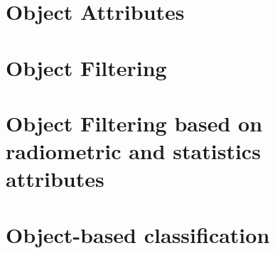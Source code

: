 \section{Object Attributes}\label{sec:ObjectAttributes}


\section{Object Filtering}


\section{Object Filtering based on radiometric and statistics attributes}


%

\section{Object-based classification}
